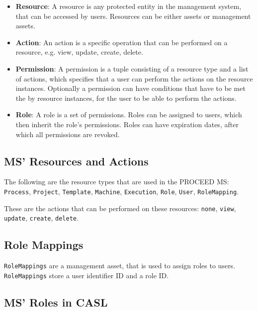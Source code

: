 \begin{itemize}
  \item \textbf{Resource}: A resource is any protected entity in the management system, that can be
    accessed by users. Resources can be either assets or management assets.
  \item \textbf{Action}: An action is a specific operation that can be performed on a resource, e.g. view, update, create, delete.
  \item \textbf{Permission}: A permission is a tuple consisting of a resource type and a list of
    actions, which specifies that a user can perform the actions on the resource instances.
    Optionally a permission can have conditions that have to be met the by resource instances,
    for the user to be able to perform the actions.
  \item \textbf{Role}: A role is a set of permissions. Roles can be assigned to users, which then
    inherit the role's permissions. Roles can have expiration dates, after which all
    permissions are revoked.
\end{itemize}

\subsection{MS' Resources and Actions}
\label{cha:relatedwork:proceedroles:ms-resources-actions}

The following are the resource types that are used in the PROCEED MS:
\lstinline{Process},
\lstinline{Project},
\lstinline{Template},
\lstinline{Machine},
\lstinline{Execution},
\lstinline{Role},
\lstinline{User},
\lstinline{RoleMapping}.

These are the actions that can be performed on these resources:
\lstinline{none},
\lstinline{view},
\lstinline{update},
\lstinline{create},
\lstinline[keywords={}]{delete}.

\subsection{Role Mappings}
\label{cha:relatedwork:proceedroles:role-mappings}

\lstinline{RoleMappings} are a management asset, that is used to assign roles to users.
\lstinline{RoleMappings} store a user identifier ID and a role ID.

\subsection{MS' Roles in CASL}
\label{cha:relatedwork:proceedroles:casl}

